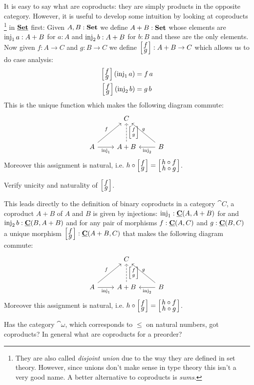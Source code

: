 It is easy to say what are coproducts: they are simply products in the opposite category. However, it is useful to develop some intuition by looking at coproducts
\footnote{They are also called \emph{disjoint union} due to the way they are defined in set theory. However, since unions don't make sense in type theory this isn't a very good name. A better alternative to coproducts is \emph{sums}.}
 in $\underline{\mathbf{\mathbf{Set}}}$ first: Given $A,B : \mathbf{Set}$ we define $A + B : \mathbf{Set}$ whose elements are $\mathrm{inj}_1\,a : A+B$ for $a:A$ and $\mathrm{inj}_2\,b : A+B$ for $b:B$ and these are the only elements. Now given $f : A \to C$ and $g : B \to C$ we define $\case{f}{g} : A + B \to C$ which allows us to do case analysis:
\begin{align*}
\case{f}{g}\,(\inj_1\,a) & = f\,a \\
\case{f}{g}\,(\inj_2\,b) & = g\,b
\end{align*}
This is the unique function which makes the following diagram commute:
\[\begin{tikzcd}[row sep=large]
& C \\
A \arrow[r,"\inj_1" below] \arrow[ur,"f"] & A + B \arrow[u,dashrightarrow,"\case{f}{g}" right] & B \arrow[l,"\inj_2"] \arrow[ul,"g" above]
\end{tikzcd}\]
Moreover this assignment is natural, i.e. $h \circ \case{f}{g} = \case{h\circ f}{h\circ g}$.
\begin{Exercise}
  Verify unicity and naturality of $\case{f}{g}$.
\end{Exercise}

This leads directly to the definition of binary coproducts in a category $\cat{C}$, a coproduct $A+B$ of $A$ and $B$ is given by injections:
$\mathrm{inj}_1 : \underline{\mathbf{C}}(A,A+B)$ for and $\mathrm{inj}_2\,b : \underline{\mathbf{C}}(B,A+B)$ and for any pair of morphisms $f : \underline{\mathbf{C}}(A,C)$ and 
$g : \underline{\mathbf{C}}(B,C)$ a unique morphism $\case{f}{g} : \homC{C}{A+B}{C}$ that makes the following diagram commute:
\[\begin{tikzcd}[row sep=large]
& C \\
A \arrow[r,"\inj_1" below] \arrow[ur,"f"] & A + B \arrow[u,dashrightarrow,"\case{f}{g}" right] & B \arrow[l,"\inj_2"] \arrow[ul,"g" above]
\end{tikzcd}\]
Moreover this assignment is natural, i.e. $h \circ \case{f}{g} = \case{h\circ f}{h\circ g}$.

\begin{question}
  Has the category $\cat{\omega}$, which corresponds to $\leq$ on natural numbers, got coproducts? In general what are coproducts for a preorder?
\end{question}

